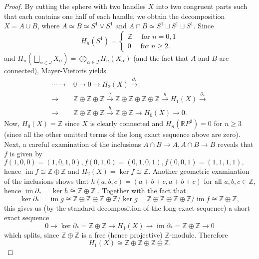\documentclass[12pt,a4paper]{article}
\newcommand{\R}{\mathbb{R}}
\newcommand{\Z}{\mathbb{Z}}
\DeclareMathOperator{\im}{im}
\newcommand{\dd}{\partial}
\newcounter{exercise}
\begin{document}
\pagestyle{fancy}                      %
\fancyhf{}                             %
\addtolength{\topmargin}{-30 pt}                   %
\setlength{\headsep}{10 pt}                      %
\renewcommand{\headrulewidth}{1 pt}                %
\renewcommand*{\proofname}{Solution}
\ex\mbox{} 
\begin{proof}
By cutting the sphere with two handles $X$ into two congruent parts such that each contains one half of each handle, we obtain the decomposition $X=A\cup B$, where $A\simeq B \simeq S^1\vee S^1$ and $A\cap B \simeq S^1\sqcup S^1\sqcup S^1$. Since $$H_n(S^1)=
\begin{cases}
\Z \quad \text{ for } n=0,1\\
0 \quad \text{ for } n\geq 2.
\end{cases}$$
and $H_n(\bigsqcup_{\alpha\in J} X_\alpha)=\bigoplus_{\alpha\in J} H_n(X_\alpha)$ (and the fact that $A$ and $B$ are connected), Mayer-Vietoris yields 
\begin{equation*}
\begin{split}
\cdots\to &0\to 0\to H_2(X)\xrightarrow{\dd_*} \\
\to  &\Z\oplus\Z\oplus\Z \xrightarrow{f} \Z\oplus\Z\oplus\Z\oplus\Z \xrightarrow{g} H_1(X) \xrightarrow{\dd_*} \\
\to  &\Z\oplus\Z\oplus\Z \xrightarrow{h} \Z\oplus\Z\to H_0(X) \to 0.
\end{split}
\end{equation*}
Now, $H_0(X)=\Z$ since $X$ is clearly connected and $H_n(\R P^2)=0$ for $n\geq 3$ (since all the other omitted terms of the long exact sequence above are zero). Next, a careful examination of the inclusions $A\cap B\to A, A\cap B \to B$ reveals that $f$ is given by $f(1,0,0)=(1,0,1,0), f(0,1,0)=(0,1,0,1), f(0,0,1)=(1,1,1,1),$ hence $\im f\cong \Z\oplus\Z$ and $H_2(X)=\ker f\cong \Z$. Another geometric examination of the inclusions shows that $h(a,b,c)=(a+b+c,a+b+c)$ for all $a,b,c\in\Z$, hence $\im \dd_*=\ker h\cong\Z\oplus \Z$ . Together with the fact that $$\ker \dd_*=\im g\cong  \Z\oplus\Z\oplus\Z\oplus\Z/\ker g=\Z\oplus\Z\oplus\Z\oplus\Z/\im f\cong \Z\oplus\Z,$$
this gives us (by the standard decomposition of the long exact sequence) a short exact sequence $$0\to \ker \dd_*=\Z\oplus\Z\to H_1(X)\to \im \dd_*=\Z\oplus\Z\to 0$$
which splits, since $\Z\oplus\Z$ is a free (hence projective) $\Z$-module. Therefore $$H_1(X)\cong\Z\oplus\Z\oplus\Z\oplus\Z.$$
\end{proof}
\end{document}
